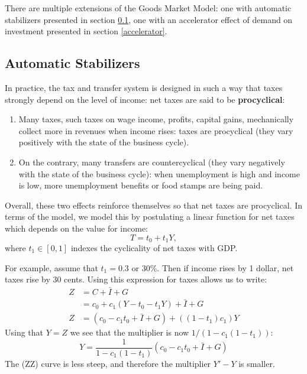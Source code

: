\documentclass[]{book}
\theoremstyle{definition}
\theoremstyle{definition}
\theoremstyle{definition}
\theoremstyle{remark}
\begin{document}
There are multiple extensions of the Goods Market Model: one with
automatic stabilizers presented in section \ref{automatic}, one with an
accelerator effect of demand on investment presented in section
\ref{accelerator}.

\subsection{Automatic Stabilizers}\label{automatic}

In practice, the tax and transfer system is designed in such a way that
taxes strongly depend on the level of income: net taxes are said to be
\textbf{procyclical}:

\begin{enumerate}
\def\labelenumi{\arabic{enumi}.}
\item
  Many taxes, such taxes on wage income, profits, capital gains,
  mechanically collect more in revenues when income rises: taxes are
  procyclical (they vary positively with the state of the business
  cycle).
\item
  On the contrary, many transfers are countercyclical (they vary
  negatively with the state of the business cycle): when unemployment is
  high and income is low, more unemployment benefits or food stamps are
  being paid.
\end{enumerate}

Overall, these two effects reinforce themselves so that net taxes are
procyclical. In terms of the model, we model this by postulating a
linear function for net taxes which depends on the value for income:
\[T=t_{0}+t_{1}Y,\] where \(t_1 \in [0,1]\) indexes the cyclicality of
net taxes with GDP.

For example, assume that \(t_1=0.3\) or 30\%. Then if income rises by 1
dollar, net taxes rise by 30 cents. Using this expression for taxes
allows us to write: \[
\begin{aligned}
Z   &=C+\bar{I}+G\\
    &=c_{0}+c_{1}\left(Y-t_{0}-t_{1}Y\right)+\bar{I}+G\\
Z   &=\left(c_{0}-c_{1}t_{0}+\bar{I}+G\right)+\left(\left(1-t_{1}\right)c_{1}\right)Y
\end{aligned}
\] Using that \(Y=Z\) we see that the multiplier is now
\(1/(1-c_1(1-t_1))\):
\[Y=\frac{1}{1-c_{1}\left(1-t_{1}\right)}\left(c_{0}-c_{1}t_{0}+\bar{I}+G\right)\]
The (ZZ) curve is less steep, and therefore the multiplier \(Y'-Y\) is
smaller.
\end{document}
